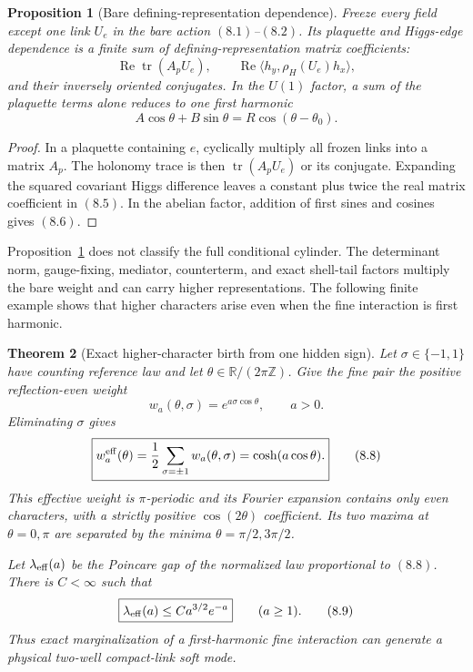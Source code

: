 \documentclass[11pt]{article}
\newtheorem{theorem}{Theorem}[section]
\newtheorem{proposition}[theorem]{Proposition}
\theoremstyle{remark}
\begin{document}
\begin{proposition}[Bare defining-representation dependence]
\label{prop:v15v8-bare-head}
Freeze every field except one link \(U_e\) in the bare action
\((8.1)\)--\((8.2)\).  Its plaquette and Higgs-edge dependence is
a finite sum of defining-representation matrix coefficients:
\[
 \operatorname{Re}\operatorname{tr}(A_pU_e),\qquad
 \operatorname{Re}\langle h_y,\rho_H(U_e)h_x\rangle,         \tag{8.5}
\]
and their inversely oriented conjugates.  In the \(U(1)\) factor,
a sum of the plaquette terms alone reduces to one first harmonic
\[
 A\cos\theta+B\sin\theta
 =R\cos(\theta-\theta_0).                                    \tag{8.6}
\]
\end{proposition}

\begin{proof}
In a plaquette containing \(e\), cyclically multiply all frozen
links into a matrix \(A_p\).  The holonomy trace is then
\(\operatorname{tr}(A_pU_e)\) or its conjugate.  Expanding the
squared covariant Higgs difference leaves a constant plus twice
the real matrix coefficient in \((8.5)\).  In the abelian factor,
addition of first sines and cosines gives \((8.6)\).
\end{proof}

Proposition~\ref{prop:v15v8-bare-head} does not classify the full
conditional cylinder.  The determinant norm, gauge-fixing,
mediator, counterterm, and exact shell-tail factors multiply the
bare weight and can carry higher representations.  The following
finite example shows that higher characters arise even when the
fine interaction is first harmonic.

\begin{theorem}[Exact higher-character birth from one hidden sign]
\label{thm:v15v8-hidden-sign}
Let \(\sigma\in\{-1,1\}\) have counting reference law and let
\(\theta\in\mathbb R/(2\pi\mathbb Z)\).  Give the fine pair the
positive reflection-even weight
\[
 w_a(\theta,\sigma)=e^{a\sigma\cos\theta},
 \qquad a>0.                                                 \tag{8.7}
\]
Eliminating \(\sigma\) gives
\[
 \boxed{
 w_a^{\rm eff}(\theta)
 =\frac12\sum_{\sigma=\pm1}w_a(\theta,\sigma)
 =\cosh(a\cos\theta).}                                       \tag{8.8}
\]
This effective weight is \(\pi\)-periodic and its Fourier
expansion contains only even characters, with a strictly positive
\(\cos(2\theta)\) coefficient.  Its two maxima at
\(\theta=0,\pi\) are separated by the minima
\(\theta=\pi/2,3\pi/2\).

Let \(\lambda_{\rm eff}(a)\) be the Poincare gap of the normalized
law proportional to \((8.8)\).  There is \(C<\infty\) such that
\[
 \boxed{\lambda_{\rm eff}(a)\le Ca^{3/2}e^{-a}}
 \qquad(a\ge1).                                              \tag{8.9}
\]
Thus exact marginalization of a first-harmonic fine interaction
can generate a physical two-well compact-link soft mode.
\end{theorem}
\end{document}
